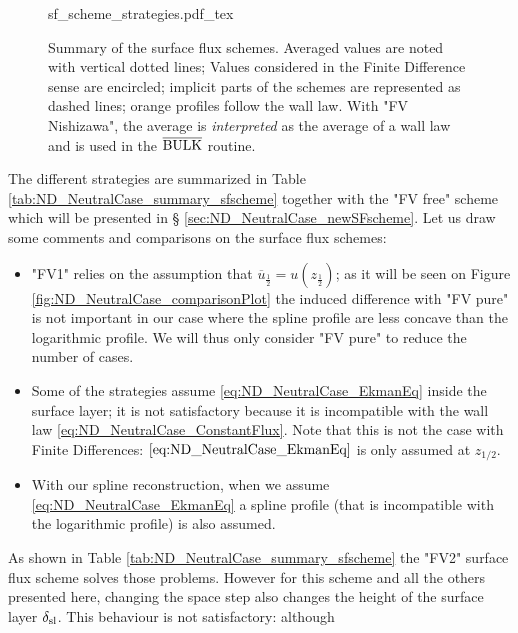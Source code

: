 \begin{figure}
	\centering
	{sf_scheme_strategies.pdf_tex}
	\caption{Summary of the surface flux schemes.
	Averaged values are noted with vertical dotted lines;
	Values considered in the Finite Difference
	sense are encircled; implicit parts of the schemes
	are represented as dashed lines; orange profiles
	follow the wall law.
	With "FV Nishizawa", the average is \textit{interpreted}
	as the average of a wall law and is used in the
	$\overline{\rm BULK}$ routine.
	}
	\label{fig:ND_NeutralCase_summary_sfscheme}
\end{figure}
The different strategies are summarized in Table
\ref{tab:ND_NeutralCase_summary_sfscheme} together with the
"FV free" scheme which will be presented in \S
\ref{sec:ND_NeutralCase_newSFscheme}.
Let us draw some comments and comparisons on the surface flux schemes:
\begin{itemize}
	\item "FV1" relies on the assumption that
		$\overline{u}_{\frac{1}{2}} = u(z_{\frac{1}{2}})$;
		as it will be seen on Figure
		\ref{fig:ND_NeutralCase_comparisonPlot} the
		induced difference with "FV pure" is not important
		in our case where the spline profile are less concave
		than the logarithmic profile.
		We will thus only consider "FV pure" to
		reduce the number of cases.
	\item Some of the strategies assume
		\eqref{eq:ND_NeutralCase_EkmanEq} inside the surface
		layer; it is not satisfactory because it is
		incompatible with the wall law
		\eqref{eq:ND_NeutralCase_ConstantFlux}.
		Note that this is not
		the case with Finite Differences:
		$\eqref{eq:ND_NeutralCase_EkmanEq}$ is only assumed
		at $z_{1/2}$.
	\item With our spline reconstruction, when we assume
		\eqref{eq:ND_NeutralCase_EkmanEq} a spline
		profile (that is incompatible
		with the logarithmic profile) is also assumed.
\end{itemize}
As shown in Table \ref{tab:ND_NeutralCase_summary_sfscheme}
the "FV2" surface flux scheme solves those problems.
However for this scheme and all the others presented here,
changing the space step
also changes the height of the surface layer $\delta_{\rm sl}$.
This behaviour is not satisfactory: although
